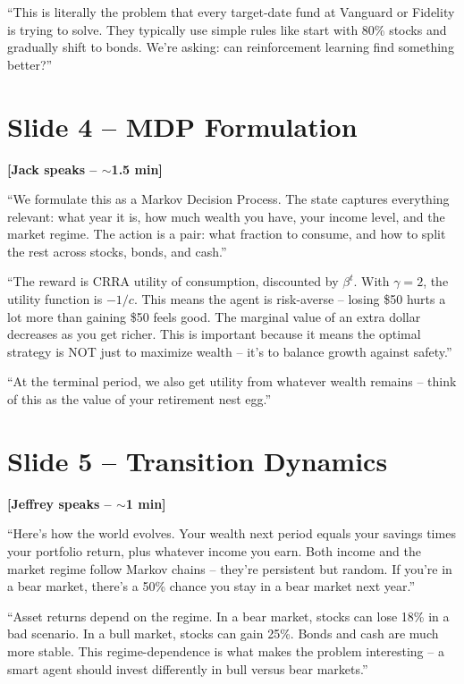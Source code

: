 \documentclass[11pt, letterpaper]{article}
\begin{document}
``This is literally the problem that every target-date fund at Vanguard or Fidelity is trying to solve. They typically use simple rules like start with 80\% stocks and gradually shift to bonds. We're asking: can reinforcement learning find something better?''

\section{Slide 4 -- MDP Formulation}

\textbf{[Jack speaks -- $\sim$1.5 min]}

``We formulate this as a Markov Decision Process. The state captures everything relevant: what year it is, how much wealth you have, your income level, and the market regime. The action is a pair: what fraction to consume, and how to split the rest across stocks, bonds, and cash.''

``The reward is CRRA utility of consumption, discounted by $\beta^t$. With $\gamma = 2$, the utility function is $-1/c$. This means the agent is risk-averse -- losing \$50 hurts a lot more than gaining \$50 feels good. The marginal value of an extra dollar decreases as you get richer. This is important because it means the optimal strategy is NOT just to maximize wealth -- it's to balance growth against safety.''

``At the terminal period, we also get utility from whatever wealth remains -- think of this as the value of your retirement nest egg.''

\section{Slide 5 -- Transition Dynamics}

\textbf{[Jeffrey speaks -- $\sim$1 min]}

``Here's how the world evolves. Your wealth next period equals your savings times your portfolio return, plus whatever income you earn. Both income and the market regime follow Markov chains -- they're persistent but random. If you're in a bear market, there's a 50\% chance you stay in a bear market next year.''

``Asset returns depend on the regime. In a bear market, stocks can lose 18\% in a bad scenario. In a bull market, stocks can gain 25\%. Bonds and cash are much more stable. This regime-dependence is what makes the problem interesting -- a smart agent should invest differently in bull versus bear markets.''
\end{document}
